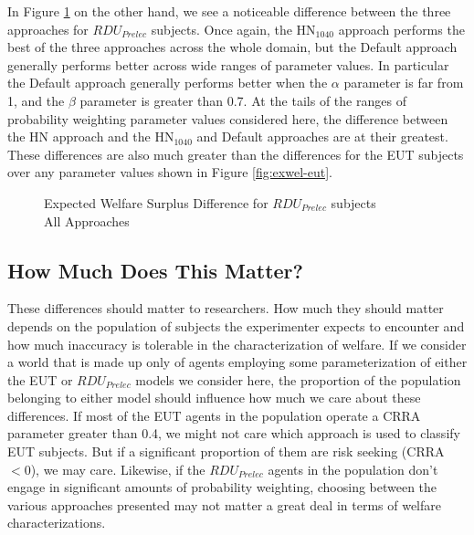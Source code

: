 \documentclass[../main.tex]{subfiles}
\begin{document}
In Figure \ref{fig:exwel-pre} on the other hand, we see a noticeable difference between the three approaches for $\mathit{RDU_{Prelec}}$ subjects.
Once again, the $\text{HN}_{1040}$ approach performs the best of the three approaches across the whole domain, but the Default approach generally performs better across wide ranges of parameter values.
In particular the Default approach generally performs better when the $\alpha$ parameter is far from 1, and the $\beta$ parameter is greater than 0.7.
At the tails of the ranges of probability weighting parameter values considered here, the difference between the HN approach and the $\text{HN}_{1040}$ and Default approaches are at their greatest.
These differences are also much greater than the differences for the EUT subjects over any parameter values shown in Figure  \ref{fig:exwel-eut}.

\begin{figure}[h!]
	\center
	\caption{Expected Welfare Surplus Difference for $\mathit{RDU_{Prelec}}$ subjects\\All Approaches}
	\label{fig:exwel-pre}
\end{figure}

\subsection{How Much Does This Matter?}

These differences should matter to researchers.
How much they should matter depends on the population of subjects the experimenter expects to encounter and how much inaccuracy is tolerable in the characterization of welfare.
If we consider a world that is made up only of agents employing some parameterization of either the EUT or $\mathit{RDU_{Prelec}}$ models we consider here, the proportion of the population belonging to either model should influence how much we care about these differences.
If most of the EUT agents in the population operate a CRRA parameter greater than 0.4, we might not care which approach is used to classify EUT subjects.
But if a significant proportion of them are risk seeking (CRRA $< 0$), we may care.
Likewise, if the $\mathit{RDU_{Prelec}}$ agents in the population don't engage in significant amounts of probability weighting, choosing between the various approaches presented may not matter a great deal in terms of welfare characterizations.
\end{document}
